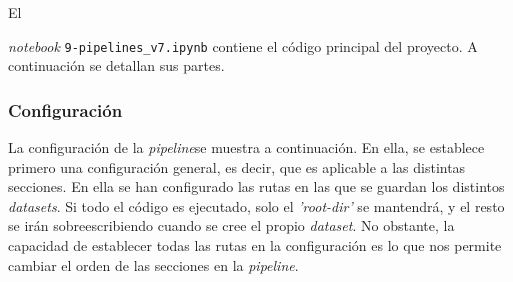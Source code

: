 El {\textit{notebook} \texttt{9-pipelines\_v7.ipynb} contiene el código principal del proyecto. A continuación se detallan sus partes.

\subsubsection{Configuración}

La configuración de la \textit{pipeline}se muestra a continuación. En ella, se establece primero una configuración general, es decir, que es aplicable a
las distintas secciones. En ella se han configurado las rutas en las que se guardan los distintos \textit{datasets}. Si todo el código es ejecutado, solo el
\textit{'root-dir'} se mantendrá, y el resto se irán sobreescribiendo cuando se cree el propio \textit{dataset}. No obstante, la capacidad de establecer todas
las rutas en la configuración es lo que nos permite cambiar el orden de las secciones en la \textit{pipeline}. 

}
